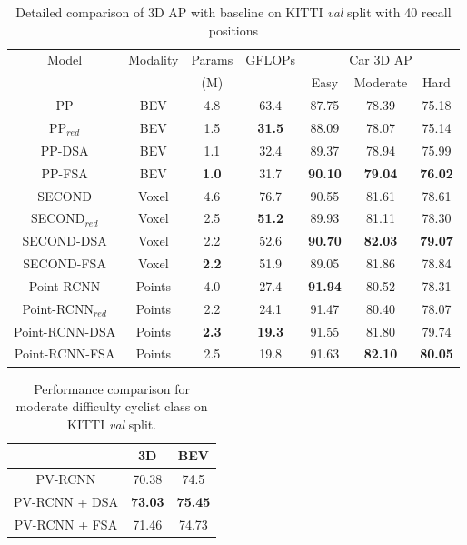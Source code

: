 \documentclass[10pt,twocolumn,letterpaper]{article}
\begin{document}
\begin{table*}[h]
\centering
    \begin{tabular*}{\textwidth}{|c|c|cc|ccc|}
        \hline
        Model & Modality & Params & GFLOPs & \multicolumn{3}{c|}{Car 3D AP} \\ 
        & & (M) & & Easy & Moderate & Hard \\
        \hline
        PP \cite{pointpillars} & BEV & 4.8 & 63.4 & 87.75 & 78.39 & 75.18
         \\
         PP$_{red}$ & BEV & 1.5 & \textbf{31.5} & 88.09 & 78.07 & 75.14
        \\
         PP-DSA & BEV & 1.1 & 32.4 & 89.37 & 78.94 & 75.99
        \\
        PP-FSA & BEV & \textbf{1.0} & 31.7 & \textbf{90.10} & \textbf{79.04} & \textbf{76.02}
        \\
        \hline
    SECOND \cite{SECOND} & Voxel & 4.6 & 76.7 & 90.55 & 81.61 & 78.61
         \\
         SECOND$_{red}$ & Voxel & 2.5 & \textbf{51.2} & 89.93 & 81.11 & 78.30
        \\
         SECOND-DSA & Voxel & 2.2 & 52.6 & \textbf{90.70} & \textbf{82.03} & \textbf{79.07}
        \\
        SECOND-FSA & Voxel & \textbf{2.2} & 51.9 & 89.05 & 81.86 & 78.84
        \\
        \hline
        Point-RCNN \cite{PointRCNN} & Points & 4.0 & 27.4 & \textbf{91.94} & 80.52 & 78.31
         \\
         Point-RCNN$_{red}$ & Points & 2.2 & 24.1 & 91.47 & 80.40 & 78.07
        \\
         Point-RCNN-DSA & Points & \textbf{2.3} & \textbf{19.3} & 91.55 & 81.80 & 79.74
        \\
        Point-RCNN-FSA & Points & 2.5 & 19.8 & 91.63 & \textbf{82.10} & \textbf{80.05}
        \\
        \hline
    \end{tabular*}
    \caption{Detailed comparison of 3D AP with baseline on KITTI \textit{val} split with 40 recall positions}
    \label{tab:kitti_val_details}
\end{table*}
 \setlength{\tabcolsep}{1pt}
\begin{table}[h]
    \centering
    \begin{tabular}{c||cc}
        \hline
        & {3D} & {BEV}  \\
        \hline
        PV-RCNN \cite{PVRCNN} & 70.38 & 74.5 \\
        PV-RCNN + DSA & \bf{73.03} &\bf{75.45}  \\
        PV-RCNN + FSA & 71.46 & 74.73  \\
        \hline
    \end{tabular}
    \caption{Performance comparison for moderate difficulty cyclist class on KITTI \textit{val} split.}
    \label{tab:kitti_val_cyclist}
\end{table}
\end{document}
